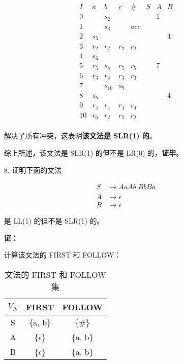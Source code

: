 \begin{enumerate}
    \begin{equation*}
        \begin{array}{c|cccc|ccc}
            I & a & b & c & \# & S & A & B \\
            \hline
            0 & & s_2 & & & & 1 & \\
            1 & & s_3 & & acc & & & \\
            2 & s_5 & & & & & & 4 \\
            3 & r_2 & r_2 & r_2 & r_2 & & & \\
            4 & s_6 & & & & & & \\
            5 & r_5 & s_8 & r_5 & r_5 & & 7 & \\
            6 & r_3 & r_3 & r_3 & r_3 & & & \\
            7 & & s_{10} & s_9 & & & & \\
            8 & s_5 & & & & & & 4 \\
            9 & r_4 & r_4 & r_4 & r_4 & & & \\
            10 & r_6 & r_2 & r_2 & r_2 & & & \\
        \end{array}
    \end{equation*}
    
    解决了所有冲突，这表明\textbf{该文法是 SLR(1) 的}。
    
    综上所述，该文法是 SLR(1) 的但不是 LR(0) 的，\textbf{证毕}。
    
    \item[8.] 证明下面的文法
    
    \begin{align*}
        S & \to AaAb | BbBa \\
        A & \to \epsilon \\
        B & \to \epsilon
    \end{align*}
    
    是 LL(1) 的但不是 SLR(1) 的。
    
    \textbf{证：}
    
    计算该文法的 FIRST 和 FOLLOW：
    
    \begin{table}[H]
        \centering
        \begin{tabular}{c|cc}
            $V_N$ & FIRST & FOLLOW \\
            \hline
            S & \{a, b\} & \{\#\} \\
            A & \{$\epsilon$\} & \{a, b\} \\
            B & \{$\epsilon$\} & \{a, b\} \\
        \end{tabular}
        \caption{文法的 FIRST 和 FOLLOW 集}
        \label{tab:FF_8}
    \end{table}
    

\end{enumerate}
